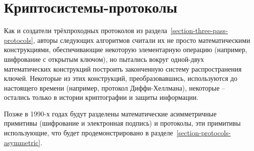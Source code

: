 \section{Криптосистемы-протоколы}\label{section-cryptosystems-protocols}

Как и создатели трёхпроходных протоколов из раздела~\ref{section-three-pass-protocols}, авторы следующих алгоритмов считали их не просто математическими конструкциями, обеспечивающие некоторую элементарную операцию (например, шифрование с открытым ключом), но пытались вокруг одной-двух математических конструкций построить законченную систему распространения ключей. Некоторые из этих конструкций, преобразовавшись, используются до настоящего времени (например, протокол Диффи-Хеллмана), некоторые -- остались только в истории криптографии и защиты информации.

Позже в 1990-х годах будут разделены математические асимметричные примитивы (шифрование и электронная подпись) и протоколы, эти примитивы использующие, что будет продемонстрировано в разделе~\ref{section-protocols-asymmetric}.








